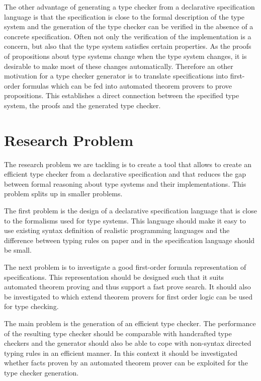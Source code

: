 \documentclass{acm_proc_article-sp}
\begin{document}
The other advantage of generating a type checker from a declarative
specification language is that the specification is close to the
formal description of the type system and the generation of the type
checker can be verified in the absence of a concrete
specification. Often not only the verification of the implementation
is a concern, but also that the type system satisfies certain
properties. As the proofs of propositions about type systems change
when the type system changes, it is desirable to make most of these
changes automatically. Therefore an other motivation for a type
checker generator is to translate specifications into first-order
formulas which can be fed into automated theorem provers to prove
propositions. This establishes a direct connection between the
specified type system, the proofs  and the generated type checker.

\section{Research Problem}
The research problem we are tackling is to create a tool that allows
to create an efficient type checker from a declarative specification
and that reduces the gap between formal reasoning about type systems
and their implementations. This problem splits up in smaller problems.

The first problem is the design of a declarative specification
language that is close to the formalisms used for type systems. This
language should make it easy to use existing syntax definition of
realistic programming languages and the difference between typing
rules on paper and in the specification language should be small.

The next problem is to investigate a good first-order formula
representation of specifications. This representation should be
designed such that it suits automated theorem proving and thus support
a fast prove search. It should also be investigated to which extend
theorem provers for first order logic can be used for type checking.

The main problem is the generation of an efficient type checker. The
performance of the resulting type checker should be comparable with
handcrafted type checkers and the generator should also be able to
cope with non-syntax directed typing rules in an efficient manner. In
this context it should be investigated whether facts proven by an
automated theorem prover can be exploited for the type checker
generation.
\end{document}
